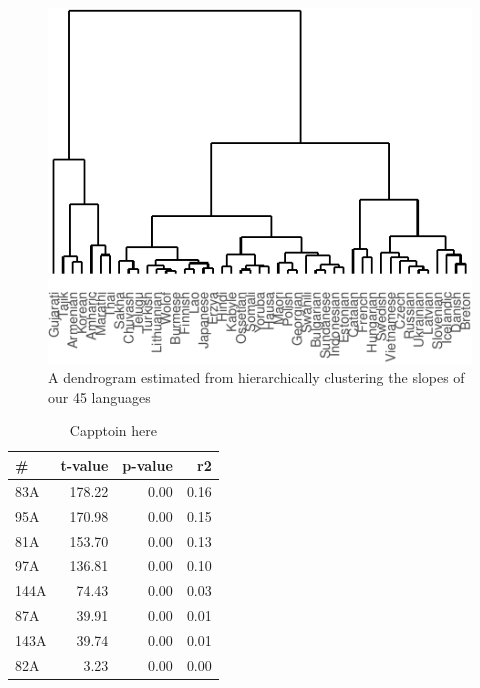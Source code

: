 \documentclass[10pt, letterpaper]{article}
\newenvironment{CodeChunk}{}{}
\begin{document}
\begin{CodeChunk}
\begin{figure}[tb]

{\centering \includegraphics{figs/clust_tree-1} 

}

\caption[A dendrogram estimated from hierarchically clustering the slopes of our 45 languages]{A dendrogram estimated from hierarchically clustering the slopes of our 45 languages}\label{fig:clust_tree}
\end{figure}
\end{CodeChunk}

\begin{table}[tb]
\centering
\begin{tabular}{lrrr}
  \hline
\# & t-value & p-value & r2 \\ 
  \hline
83A & 178.22 & 0.00 & 0.16 \\ 
  95A & 170.98 & 0.00 & 0.15 \\ 
  81A & 153.70 & 0.00 & 0.13 \\ 
  97A & 136.81 & 0.00 & 0.10 \\ 
  144A & 74.43 & 0.00 & 0.03 \\ 
  87A & 39.91 & 0.00 & 0.01 \\ 
  143A & 39.74 & 0.00 & 0.01 \\ 
  82A & 3.23 & 0.00 & 0.00 \\ 
   \hline
\end{tabular}
\caption{Capptoin here} 
\label{tab:tab_features}
\end{table}
\end{document}
